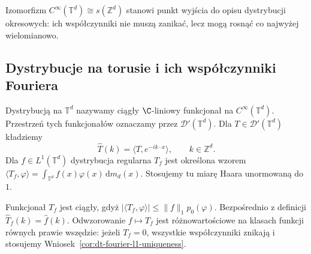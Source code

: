 Izomorfizm $C^\infty(\mathbb T^d)\cong s(\mathbb Z^d)$
stanowi punkt wyjścia do opisu dystrybucji
okresowych: ich współczynniki nie muszą zanikać,
lecz mogą rosnąć co najwyżej wielomianowo.


\subsection{Dystrybucje na torusie i ich współczynniki Fouriera}

\begin{definicja}
\label{def:dt-periodic-distribution}
Dystrybucją na $\mathbb T^d$ nazywamy ciągły
$\C$-liniowy funkcjonał na
$C^\infty(\mathbb T^d)$. Przestrzeń tych
funkcjonałów oznaczamy przez $\mathcal D'(\mathbb T^d)$.
Dla $T\in\mathcal D'(\mathbb T^d)$ kładziemy
\[
 \widehat T(k)=\langle T,e^{-ik\cdot x}\rangle,
 \qquad k\in\mathbb Z^d.
\]
Dla $f\in L^1(\mathbb T^d)$ dystrybucja regularna
$T_f$ jest określona wzorem
$\langle T_f,\varphi\rangle=\int_{\mathbb T^d}
f(x)\varphi(x)\,\mathrm dm_d(x)$.
Stosujemy tu miarę Haara unormowaną do $1$.
\end{definicja}

Funkcjonał $T_f$ jest ciągły, gdyż
$|\langle T_f,\varphi\rangle|\le\|f\|_1p_0(\varphi)$.
Bezpośrednio z definicji $\widehat T_f(k)=\widehat f(k)$.
Odwzorowanie $f\mapsto T_f$ jest różnowartościowe
na klasach funkcji równych prawie wszędzie:
jeżeli $T_f=0$, wszystkie współczynniki znikają
i stosujemy Wniosek~\ref{cor:dt-fourier-l1-uniqueness}.

